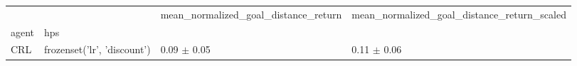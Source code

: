 \begin{tabular}{llll}
\toprule
 &  & mean_normalized_goal_distance_return & mean_normalized_goal_distance_return_scaled \\
agent & hps &  &  \\
\midrule
CRL & frozenset({'lr', 'discount'}) & 0.09 $\pm$ 0.05 & 0.11 $\pm$ 0.06 \\
\cline{1-4}
\bottomrule
\end{tabular}
